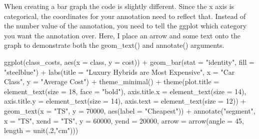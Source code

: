 \documentclass[
  letterpaper,
  DIV=11,
  numbers=noendperiod]{scrreprt}
\newenvironment{Shaded}{\begin{snugshade}}{\end{snugshade}}
\newcommand{\AttributeTok}[1]{\textcolor[rgb]{0.40,0.45,0.13}{#1}}
\newcommand{\DecValTok}[1]{\textcolor[rgb]{0.68,0.00,0.00}{#1}}
\newcommand{\FunctionTok}[1]{\textcolor[rgb]{0.28,0.35,0.67}{#1}}
\newcommand{\NormalTok}[1]{\textcolor[rgb]{0.00,0.23,0.31}{#1}}
\newcommand{\SpecialCharTok}[1]{\textcolor[rgb]{0.37,0.37,0.37}{#1}}
\newcommand{\StringTok}[1]{\textcolor[rgb]{0.13,0.47,0.30}{#1}}
\begin{document}
When creating a bar graph the code is slightly different. Since the x
axis is categorical, the coordinates for your annotation need to reflect
that. Instead of the number value of the annotation, you need to tell
the ggplot which category you want the annotation over. Here, I place an
arrow and some text onto the graph to demonstrate both the geom\_text()
and annotate() arguments.

\begin{Shaded}
\begin{Highlighting}[]
\FunctionTok{ggplot}\NormalTok{(class\_costs, }\FunctionTok{aes}\NormalTok{(}\AttributeTok{x =}\NormalTok{ class, }\AttributeTok{y =}\NormalTok{ cost)) }\SpecialCharTok{+}
  \FunctionTok{geom\_bar}\NormalTok{(}\AttributeTok{stat =} \StringTok{"identity"}\NormalTok{, }\AttributeTok{fill =} \StringTok{"steelblue"}\NormalTok{) }\SpecialCharTok{+}
  \FunctionTok{labs}\NormalTok{(}\AttributeTok{title =} \StringTok{"Luxury Hybrids are Most Expensive"}\NormalTok{, }\AttributeTok{x =} \StringTok{"Car Class"}\NormalTok{, }\AttributeTok{y =} \StringTok{"Average Cost"}\NormalTok{) }\SpecialCharTok{+}
  \FunctionTok{theme\_minimal}\NormalTok{() }\SpecialCharTok{+}
  \FunctionTok{theme}\NormalTok{(}\AttributeTok{plot.title =} \FunctionTok{element\_text}\NormalTok{(}\AttributeTok{size =} \DecValTok{18}\NormalTok{, }\AttributeTok{face =} \StringTok{"bold"}\NormalTok{),}
    \AttributeTok{axis.title.x =} \FunctionTok{element\_text}\NormalTok{(}\AttributeTok{size =} \DecValTok{14}\NormalTok{),}
    \AttributeTok{axis.title.y =} \FunctionTok{element\_text}\NormalTok{(}\AttributeTok{size =} \DecValTok{14}\NormalTok{),}
    \AttributeTok{axis.text =} \FunctionTok{element\_text}\NormalTok{(}\AttributeTok{size =} \DecValTok{12}\NormalTok{)) }\SpecialCharTok{+}
  \FunctionTok{geom\_text}\NormalTok{(}\AttributeTok{x =} \StringTok{"TS"}\NormalTok{, }\AttributeTok{y =} \DecValTok{70000}\NormalTok{, }\FunctionTok{aes}\NormalTok{(}\AttributeTok{label =} \StringTok{"Cheapest"}\NormalTok{)) }\SpecialCharTok{+}
  \FunctionTok{annotate}\NormalTok{(}\StringTok{"segment"}\NormalTok{, }\AttributeTok{x =} \StringTok{"TS"}\NormalTok{, }\AttributeTok{xend =} \StringTok{"TS"}\NormalTok{, }\AttributeTok{y =} \DecValTok{60000}\NormalTok{, }\AttributeTok{yend =} \DecValTok{20000}\NormalTok{, }\AttributeTok{arrow =} \FunctionTok{arrow}\NormalTok{(}\AttributeTok{angle =} \DecValTok{45}\NormalTok{, }\AttributeTok{length =} \FunctionTok{unit}\NormalTok{(.}\DecValTok{2}\NormalTok{,}\StringTok{"cm"}\NormalTok{))) }
\end{Highlighting}
\end{Shaded}
\end{document}
